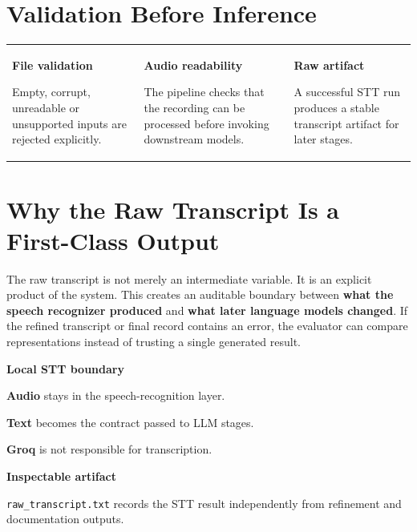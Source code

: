 \documentclass[9pt,a4paper]{extarticle}
\begin{document}
\vspace{4pt}
\section*{Validation Before Inference}
\vspace{2pt}
\begin{tabularx}{\textwidth}{@{}XXX@{}}
\begin{card}\textbf{File validation}\par Empty, corrupt, unreadable or unsupported inputs are rejected explicitly.
\end{card}&
\begin{card}\textbf{Audio readability}\par The pipeline checks that the recording can be processed before invoking downstream models.
\end{card}&
\begin{card}\textbf{Raw artifact}\par A successful STT run produces a stable transcript artifact for later stages.
\end{card}
\end{tabularx}

\vspace{4pt}
\section*{Why the Raw Transcript Is a First-Class Output}
\vspace{2pt}
\begin{card}
The raw transcript is not merely an intermediate variable. It is an explicit product of the system. This creates an auditable boundary between \textbf{what the speech recognizer produced} and \textbf{what later language models changed}. If the refined transcript or final record contains an error, the evaluator can compare representations instead of trusting a single generated result.
\end{card}

\vspace{4pt}
\begin{minipage}[t]{0.48\textwidth}
\begin{darkcard}\textbf{Local STT boundary}\end{darkcard}
\begin{card}
\small
\textbf{Audio} stays in the speech-recognition layer.\par
\textbf{Text} becomes the contract passed to LLM stages.\par
\textbf{Groq} is not responsible for transcription.
\end{card}
\end{minipage}\hfill
\begin{minipage}[t]{0.48\textwidth}
\begin{darkcard}\textbf{Inspectable artifact}\end{darkcard}
\begin{card}
\small
\texttt{raw\_transcript.txt} records the STT result independently from refinement and documentation outputs.
\end{card}
\end{minipage}
\end{document}
